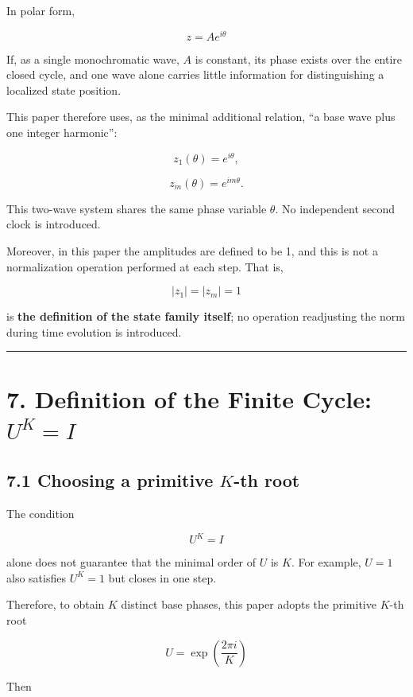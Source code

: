 \documentclass[
  a4paper,
]{article}
\begin{document}
In polar form,

\[
z
=
A e^{i\theta}
\]

If, as a single monochromatic wave, \(A\) is constant, its phase exists
over the entire closed cycle, and one wave alone carries little
information for distinguishing a localized state position.

This paper therefore uses, as the minimal additional relation, ``a base
wave plus one integer harmonic'':

\[
z_1(\theta)
=
e^{i\theta},
\]

\[
z_m(\theta)
=
e^{im\theta}.
\]

This two-wave system shares the same phase variable \(\theta\). No
independent second clock is introduced.

Moreover, in this paper the amplitudes are defined to be 1, and this is
not a normalization operation performed at each step. That is,

\[
|z_1|=|z_m|=1
\]

is \textbf{the definition of the state family itself}; no operation
readjusting the norm during time evolution is introduced.

\begin{center}\rule{0.5\linewidth}{0.5pt}\end{center}

\section{\texorpdfstring{7. Definition of the Finite Cycle:
\(U^K=I\)}{7. Definition of the Finite Cycle: U\^{}K=I}}\label{definition-of-the-finite-cycle-uki}

\subsection{\texorpdfstring{7.1 Choosing a primitive \(K\)-th
root}{7.1 Choosing a primitive K-th root}}\label{choosing-a-primitive-k-th-root}

The condition

\[
U^K=I
\]

alone does not guarantee that the minimal order of \(U\) is \(K\). For
example, \(U=1\) also satisfies \(U^K=1\) but closes in one step.

Therefore, to obtain \(K\) distinct base phases, this paper adopts the
primitive \(K\)-th root

\[
U
=
\exp\left(\frac{2\pi i}{K}\right)
\]

Then
\end{document}
